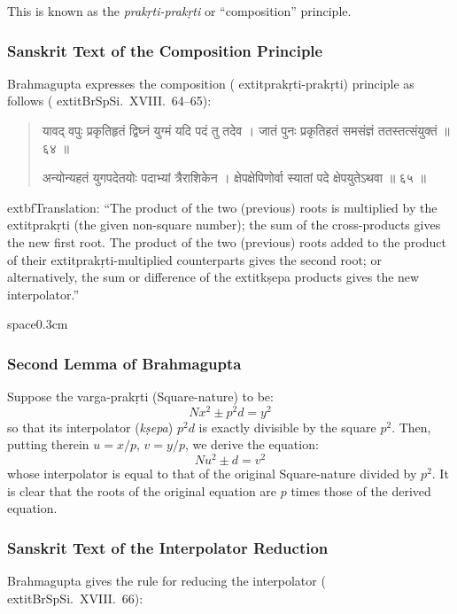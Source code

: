 \documentclass[11pt,a4paper]{article}
\newcommand{\dev}[1]{{\devanagarifont #1}}
\newenvironment{sanskritverse}{%
  \begin{quote}
  \devanagarifont
  \small
  \color{titlecolor}
}{\end{quote}}
\theoremstyle{definition}
\begin{document}
This is known as the \textit{prak\d{r}ti-prak\d{r}ti} or ``composition'' principle.

\subsubsection{Sanskrit Text of the Composition Principle}

Brahmagupta expresses the composition (	extit{prak\d{r}ti-prak\d{r}ti}) principle as follows (	extit{BrSpSi}.\ XVIII.\ 64--65):

\begin{sanskritverse}
\dev{यावद् वपुः प्रकृतिहृतं द्विघ्नं युग्मं यदि पदं तु तदेव ।}
\dev{जातं पुनः प्रकृतिहतं समसंज्ञं ततस्तत्संयुक्तं ॥ ६४ ॥}

\dev{अन्योन्यहतं युगपदेतयोः पदाभ्यां त्रैराशिकेन ।}
\dev{क्षेपक्षेपिणोर्वा स्यातां पदे क्षेपयुतेऽथवा ॥ ६५ ॥}
\end{sanskritverse}

	extbf{Translation:} ``The product of the two (previous) roots is multiplied by the 	extit{prak\d{r}ti} (the given non-square number); the sum of the cross-products gives the new first root. The product of the two (previous) roots added to the product of their 	extit{prak\d{r}ti}-multiplied counterparts gives the second root; or alternatively, the sum or difference of the 	extit{k\d{s}epa} products gives the new interpolator.''

space{0.3cm}

\subsubsection{Second Lemma of Brahmagupta}

Suppose the varga-prak\d{r}ti (Square-nature) to be:
\[
Nx^2 \pm p^2d = y^2
\]
so that its interpolator (\textit{k\d{s}epa}) $p^2d$ is exactly divisible by the square $p^2$. Then, putting therein $u = x/p$, $v = y/p$, we derive the equation:
\[
Nu^2 \pm d = v^2
\]
whose interpolator is equal to that of the original Square-nature divided by $p^2$. It is clear that the roots of the original equation are $p$ times those of the derived equation.

\subsubsection{Sanskrit Text of the Interpolator Reduction}

Brahmagupta gives the rule for reducing the interpolator (	extit{BrSpSi}.\ XVIII.\ 66):
\end{document}
